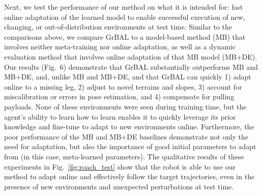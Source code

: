 Next, we test the performance of our method on what it is intended for: fast online adaptation of the learned model to enable successful execution of new, changing, or out-of-distribution environments at test time. Similar to the comparisons above, we compare GrBAL to a model-based method (MB) that involves neither meta-training nor online adaptation, as well as a dynamic evaluation method that involves online adaptation of that MB model (MB+DE).
Our results (Fig.~6) demonstrate that GrBAL substantially outperforms MB and MB+DE, and, unlike MB and MB+DE, and that GrBAL can quickly 1) adapt online to a missing leg, 2) adjust to novel terrains and slopes, 3) account for miscalibration or errors in pose estimation, and 4) compensate for pulling payloads.
None of these environments were seen during training time, but the agent's ability to learn how to learn enables it to quickly leverage its prior knowledge and fine-tune to adapt to new environments online. Furthermore, the poor performance of the MB and MB+DE baselines demonstrate not only the need for adaptation, but also the importance of good initial parameters to adapt from (in this case, meta-learned parameters).
The qualitative results of these experiments in Fig.~\ref{fig:roach_test} show that the robot is able to use our method to adapt online and effectively follow the target trajectories, even in the presence of new environments and unexpected perturbations at test time.

